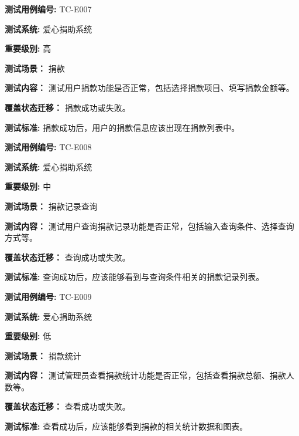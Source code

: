 \begin{framed} \textbf{测试用例编号:} TC-E007

\textbf{测试系统:} 爱心捐助系统

\textbf{重要级别:} 高

\textbf{测试场景：} 捐款

\textbf{测试内容：} 测试用户捐款功能是否正常，包括选择捐款项目、填写捐款金额等。

\textbf{覆盖状态迁移：} 捐款成功或失败。

\textbf{测试标准:} 捐款成功后，用户的捐款信息应该出现在捐款列表中。

\begin{center}  \end{center} \end{framed}

\begin{framed} \textbf{测试用例编号:} TC-E008

\textbf{测试系统:} 爱心捐助系统

\textbf{重要级别:} 中

\textbf{测试场景：} 捐款记录查询

\textbf{测试内容：} 测试用户查询捐款记录功能是否正常，包括输入查询条件、选择查询方式等。

\textbf{覆盖状态迁移：} 查询成功或失败。

\textbf{测试标准:} 查询成功后，应该能够看到与查询条件相关的捐款记录列表。

\begin{center}  \end{center} \end{framed}

\begin{framed} \textbf{测试用例编号:} TC-E009

\textbf{测试系统:} 爱心捐助系统

\textbf{重要级别:} 低

\textbf{测试场景：} 捐款统计

\textbf{测试内容：} 测试管理员查看捐款统计功能是否正常，包括查看捐款总额、捐款人数等。

\textbf{覆盖状态迁移：} 查看成功或失败。

\textbf{测试标准:} 查看成功后，应该能够看到捐款的相关统计数据和图表。

\begin{center}  \end{center} \end{framed}

